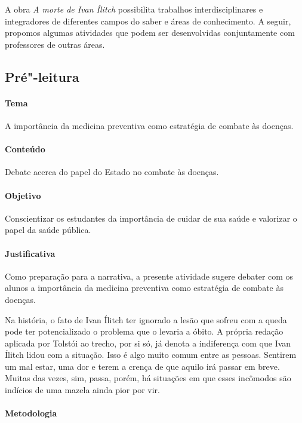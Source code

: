\documentclass[12pt]{extarticle}
\begin{document}
A obra \emph{A morte de Ivan Ílitch} possibilita trabalhos
interdisciplinares e integradores de diferentes campos do saber e áreas
de conhecimento. A seguir, propomos algumas atividades que podem ser
desenvolvidas conjuntamente com professores de outras áreas.

\subsection{Pré"-leitura}

\paragraph{Tema} A importância da medicina preventiva como
estratégia de combate às doenças.

\paragraph{Conteúdo} Debate acerca do papel do Estado no combate às doenças.

\paragraph{Objetivo} Conscientizar os estudantes da importância de cuidar
de sua saúde e valorizar o papel da saúde pública.

\paragraph{Justificativa} Como preparação para a narrativa, a presente atividade
sugere debater com os alunos a importância da medicina preventiva como
estratégia de combate às doenças.

Na história, o fato de Ivan Ílitch ter ignorado
a lesão que sofreu com a queda pode ter potencializado o problema que o
levaria a óbito. A própria redação aplicada por Tolstói ao trecho, por
si só, já denota a indiferença com que Ivan Ílitch lidou com a situação.
Isso é algo muito comum entre as pessoas. Sentirem um mal estar, uma dor
e terem a crença de que aquilo irá passar em breve. Muitas das vezes,
sim, passa, porém, há situações em que esses incômodos são indícios de
uma mazela ainda pior por vir.

\paragraph{Metodologia}
\end{document}
